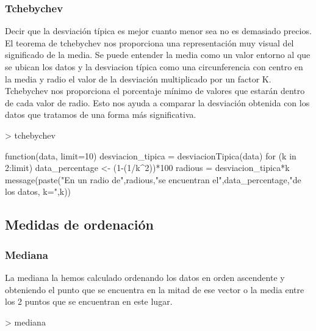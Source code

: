 \documentclass [a4paper] {article}
\begin{document}
\subsubsection{Tchebychev}
Decir que la desviación típica es mejor cuanto menor sea no es demasiado precios.
El teorema de tchebychev nos proporciona una representación muy visual del significado de la media.
Se puede entender la media como un valor entorno al que se ubican los datos y la desviacion típica como una circunferencia con centro en la media y radio el valor de la desviación multiplicado por un factor K.
Tchebychev nos proporciona el porcentaje mínimo de valores que estarán dentro de cada valor de radio.
Esto nos ayuda a comparar la desviación obtenida con los datos que tratamos de una forma más significativa.
\begin{Schunk}
\begin{Sinput}
> tchebychev
\end{Sinput}
\begin{Soutput}
function(data, limit=10){
  desviacion_tipica = desviacionTipica(data)
  for (k in 2:limit){
    data_percentage <- (1-(1/k^2))*100
    radious = desviacion_tipica*k
    message(paste("En un radio de",radious,"se encuentran el",data_percentage,"de los datos, k=",k))
  }
}
\end{Soutput}
\end{Schunk}
\subsection{Medidas de ordenación}
\subsubsection{Mediana}
La mediana la hemos calculado ordenando los datos en orden ascendente 
y obteniendo el punto que se encuentra en la mitad de ese vector 
o la media entre los 2 puntos que se encuentran en este lugar.
\begin{Schunk}
\begin{Sinput}
> mediana
\end{Sinput}
\end{Schunk}
\end{document}
